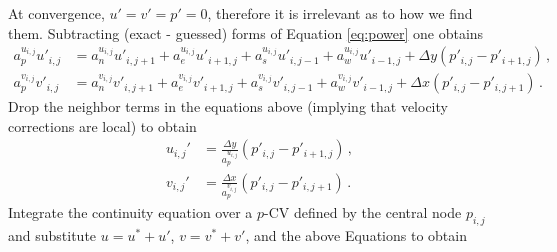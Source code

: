 \documentclass{article}
\begin{document}
At convergence, $u' = v' = p' = 0$, therefore it is irrelevant as to how we find them. Subtracting (exact - guessed) forms of Equation \eqref{eq:power} one obtains
\begin{subequations}
	\begin{align}
		a^{u_{i,j}}_p u'_{i,j} & = a^{u_{i,j}}_n u'_{i, j+1} + a^{u_{i,j}}_e u'_{i+1, j} + a^{u_{i,j}}_s u'_{i, j-1} + a^{u_{i,j}}_w u'_{i-1, j} + \Delta y (p'_{i,j} - p'_{i+1,j}) \,, \\
		a^{v_{i,j}}_p v'_{i,j} & = a^{v_{i,j}}_n v'_{i, j+1} + a^{v_{i,j}}_e v'_{i+1, j} + a^{v_{i,j}}_s v'_{i, j-1} + a^{v_{i,j}}_w v'_{i-1, j} + \Delta x (p'_{i,j} - p'_{i, j+1}) \,.
	\end{align}
\end{subequations}
Drop the neighbor terms in the equations above (implying that velocity corrections are local) to obtain
\begin{subequations}
	\label{eq:velocity_corrector}
	\begin{align}
		u_{i,j}' & = \frac{\Delta y}{a_p^{u_{i,j}}} (p'_{i,j} - p'_{i+1,j})\,, \\
		v_{i,j}' & = \frac{\Delta x}{a_p^{v_{i,j}}} (p'_{i,j} - p'_{i, j+1})\,.
	\end{align}
\end{subequations}
Integrate the continuity equation over a $p$-CV defined by the central node $p_{i,j}$ and substitute $u = u^* + u'$, $v = v^* + v'$, and the above Equations to obtain
\end{document}

